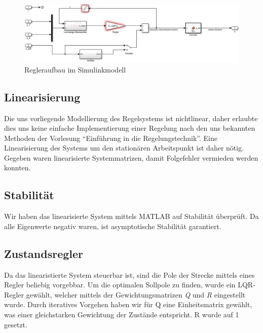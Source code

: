 \documentclass[pdf]{ifacconf}
\begin{document}
\begin{figure}[h]	
\centerline{\includegraphics[width=\linewidth]{Bilder/Regler.jpg}}
	\label{fig:Regleraufbau}
	\caption{Regleraufbau im Simulinkmodell}
\end{figure}


	\subsection{Linearisierung}
	Die uns vorliegende Modellierung des Regelsystems ist nichtlinear, daher erlaubte dies uns keine einfache Implementierung einer Regelung nach den uns bekannten Methoden der Vorlesung ``Einführung in die Regelungstechnik''. 
	Eine Linearisierung des Systems um den stationären Arbeitspunkt ist daher nötig. Gegeben waren linearisierte Systemmatrizen, damit Folgefehler vermieden werden konnten. 
	
	\subsection{Stabilität}
	Wir haben das linearisierte System mittels MATLAB auf Stabilität überprüft. Da alle Eigenwerte negativ waren, ist asymptotische Stabilität garantiert.
	
	\subsection{Zustandsregler}
	Da das linearistierte System steuerbar ist, sind die Pole der Strecke mittels eines Regler 			beliebig vorgebbar. Um die optimalen Sollpole zu finden, wurde ein LQR-Regler gewählt, 				welcher mittels der Gewichtungsmatrizen \textit{Q} und \textit{R} eingestellt wurde.
	Durch iteratives Vorgehen haben wir für Q eine Einheitsmatrix gewählt, was einer   					gleichstarken Gewichtung der Zustände entspricht. R wurde auf 1 gesetzt.
	


\end{document}
